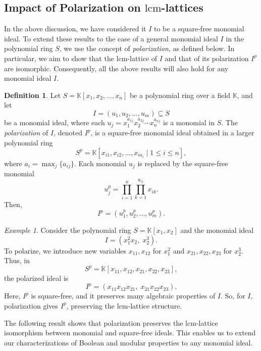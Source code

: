 \documentclass[11pt]{amsart}
\newcommand{\lcm}{\mathrm{lcm}}
\theoremstyle{plain}
\numberwithin{lemma}{\DefaultNumberTheoremWithin}
\numberwithin{claim}{\DefaultNumberTheoremWithin}
\numberwithin{theorem}{\DefaultNumberTheoremWithin}
\numberwithin{corollary}{\DefaultNumberTheoremWithin}
\numberwithin{proposition}{\DefaultNumberTheoremWithin}
\numberwithin{conjecture}{\DefaultNumberTheoremWithin}
\theoremstyle{definition}
\newtheorem{definition}{Definition}
\numberwithin{definition}{\DefaultNumberTheoremWithin}
\theoremstyle{definition}
\numberwithin{question}{\DefaultNumberTheoremWithin}
\theoremstyle{definition}
\numberwithin{problem}{\DefaultNumberTheoremWithin}
\theoremstyle{remark}
\numberwithin{remark}
     {\DefaultNumberTheoremWithin}
\theoremstyle{remark}
\newtheorem{example}{Example}
\numberwithin{example}{\DefaultNumberTheoremWithin}
\begin{document}
\subsection{Impact of Polarization on $\lcm$-lattices}\label{subsec2}
In the above discussion, we have considered it $I$ to be a square-free monomial ideal. To extend these results to the case of a general monomial ideal $I$ in the polynomial ring $S$, we use the concept of \emph{polarization}, as defined below. In particular, we aim to show that the $\lcm$-lattice of $I$ and that of its polarization $I^{p}$ are isomorphic. Consequently, all the above results will also hold for any monomial ideal $I$.

\begin{definition}%

    Let $S = \mathbb{K}[x_1, x_2, \ldots, x_n]$ be a polynomial ring over a field $\mathbb{K}$, and let 
   \[
    I = (u_1, u_2, \ldots, u_m) \subseteq S
   \] 
    be a monomial ideal, where each $u_j = x_1^{a_{1j}} x_2^{a_{2j}} \cdots x_n^{a_{nj}}$ is a monomial in $S$. The \emph{polarization} of $I$, denoted $I^{p}$, is a square-free monomial ideal obtained in a larger polynomial ring 
    \[
    S^{p} = \mathbb{K}[x_{i1}, x_{i2}, \ldots, x_{i a_i} \mid 1 \leq i \leq n],
    \] 
     where $a_i = \max_j \{a_{ij}\}$. Each monomial $u_j$ is replaced by the square-free monomial
    \[
     u_j^{p} = \prod_{i=1}^n \prod_{k=1}^{a_{ij}} x_{ik}.
    \]
    Then, 
    \[
     I^{p} = (u_1^{p}, u_2^{p}, \ldots, u_m^{p}).
    \]
\end{definition}
%
\begin{example}
    Consider the polynomial ring $S = \mathbb{K}[x_1, x_2]$ and the monomial ideal
   \[
    I = (x_1^2 x_2, \; x_2^3).
    \]
    To polarize, we introduce new variables $x_{11}, x_{12}$ for $x_1^2$ and $x_{21}, x_{22}, x_{23}$ for $x_2^3$. Thus, in 
    \[
     S^{p} = \mathbb{K}[x_{11}, x_{12}, x_{21}, x_{22}, x_{23}],
    \]
    the polarized ideal is
    \[
    I^{p} = (x_{11}x_{12}x_{21}, \; x_{21}x_{22}x_{23}).
    \]
    Here, $I^{p}$ is square-free, and it preserves many algebraic properties of $I$.
    So, for $I$, polarization gives $ I^{p}$, preserving the $\lcm$-lattice structure.
\end{example}   
 The following result shows that polarization preserves the $\lcm$-lattice isomorphism between monomial and square-free ideals. This enables us to extend our characterizations of Boolean and modular properties to any monomial ideal.
\end{document}
